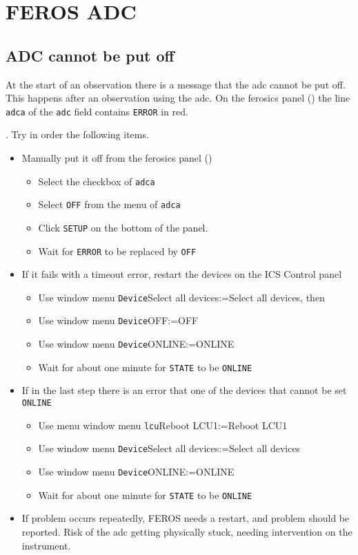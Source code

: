 \documentclass[11pt,fleqn,a4paper]{book}
\makeatletter
\def\menu#1#2{\texttt{#1}\ifx{}#2\else\@for\@x:=#2\do{$\rightarrow$\texttt{\@x}}\fi}
\def\wmenu#1#2{window menu \menu{#1}{#2}}
\makeatother
\begin{document}
\section{FEROS ADC}
\subsection{ADC cannot be put off}

At the start of an observation there is a message that the \gls{adc} cannot be
put off.  This happens after an observation using the \gls{adc}.  On the 
\gls{ferosics} panel () the line \texttt{adca} of the
\texttt{adc} field contains \texttt{ERROR} in red.  


. Try in order the following items.
\begin{itemize}
  \item Manually put it off from the \gls{ferosics} panel ()
     \begin{itemize}
      \item Select the checkbox of \texttt{adca}
      \item Select \texttt{OFF} from the menu of \texttt{adca} 
      \item Click \texttt{SETUP} on the bottom of the panel.
      \item Wait for \texttt{ERROR} to be replaced by \texttt{OFF}
      \end{itemize}
  \item If it fails with a timeout error, restart the devices on the \gls{ICS Control} panel
     \begin{itemize}
      \item Use \wmenu{Device}{Select all devices}, then
      \item Use \wmenu{Device}{OFF}
      \item Use \wmenu{Device}{ONLINE}
      \item Wait for about one minute for \texttt{STATE} to be \texttt{ONLINE}
     \end{itemize}
  \item If in the last step there is an error that one of the devices that cannot be set
        \texttt{ONLINE}
      \begin{itemize}
       \item Use menu \wmenu{\gls{lcu}}{Reboot LCU1} 
       \item Use \wmenu{Device}{Select all devices}
       \item Use \wmenu{Device}{ONLINE}
        \item Wait for about one minute for \texttt{STATE} to be \texttt{ONLINE}
      \end{itemize}
  \item If problem occurs repeatedly, FEROS needs a restart, and problem
        should be reported.  Risk of the \gls{adc} 
        getting physically stuck, needing
        intervention on the instrument.
\end{itemize}
\end{document}
